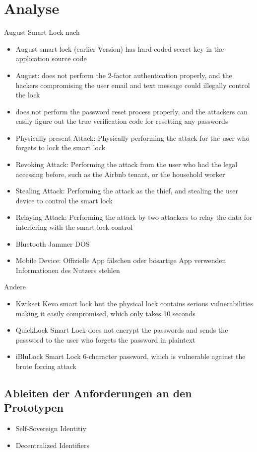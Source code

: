 \section{Analyse}
\label{sec:analysis}

	August Smart Lock nach \cite{Ye2017}
	\begin{itemize}
		\item August smart lock (earlier Version) has hard-coded secret key in the application source code \cite{Rose2016}
		\item August: does not perform the 2-factor authentication properly, and the hackers compromising the user email and text message could illegally control the lock
		\item does not perform the password reset process properly, and the	attackers can easily figure out the true verification code for resetting any passwords
		\item Physically-present Attack: Physically performing the attack for the user	who forgets to lock the smart lock
		\item Revoking Attack: Performing the attack from the user who had the legal accessing before, such as the Airbnb tenant, or the household worker
		\item Stealing Attack: Performing the attack as the thief, and stealing the user device to control the smart lock
		\item Relaying Attack: Performing the attack by two attackers to relay the data for interfering with the smart lock control
		\item Bluetooth Jammer \textrightarrow DOS
		\item Mobile Device: Offizielle App fälschen oder bösartige App verwenden \textrightarrow Informationen des Nutzers stehlen \textrightarrow 
		
	\end{itemize}

	Andere
	\begin{itemize}
		\item Kwikset Kevo smart lock but the physical lock contains serious vulnerabilities making it easily compromised, which only takes 10 seconds\cite{Ye2017}
		\item QuickLock Smart Lock does not encrypt the passwords and sends the password to the user who forgets the password in plaintext\cite{Ye2017}
		\item iBluLock Smart Lock 6-character password, which is vulnerable against the brute forcing attack\cite{Ye2017}
	\end{itemize}
	
	
	\subsection{Ableiten der Anforderungen an den Prototypen}
	\label{sec:requirements_prototype}
	    \begin{itemize}
	        \item Self-Sovereign Identitiy
	        \item Decentralized Identifiers
	    \end{itemize}